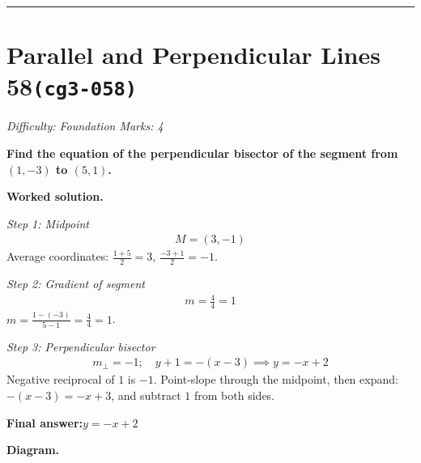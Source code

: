 \documentclass[11pt]{article}
\newcommand{\question}[1]{\par\medskip\noindent\textbf{#1}\par}
\begin{document}
\medskip\hrule

\section*{Parallel and Perpendicular Lines 58\quad\small\texttt{(cg3-058)}}
\textit{Difficulty: Foundation \quad\textbar\quad Marks: 4}

\question{Find the equation of the perpendicular bisector of the segment from \( (1, -3) \) to \( (5, 1) \).}

\textbf{Worked solution.}

\textit{Step 1: Midpoint}
\[\begin{gathered}
M = (3, -1)
\end{gathered}\]
Average coordinates: \( \tfrac{1+5}{2} = 3 \), \( \tfrac{-3+1}{2} = -1 \).

\textit{Step 2: Gradient of segment}
\[\begin{gathered}
m = \frac{4}{4} = 1
\end{gathered}\]
\( m = \tfrac{1 - (-3)}{5 - 1} = \tfrac{4}{4} = 1 \).

\textit{Step 3: Perpendicular bisector}
\[\begin{gathered}
m_{\perp} = -1; \quad y + 1 = -(x - 3) \implies y = -x + 2
\end{gathered}\]
Negative reciprocal of \( 1 \) is \( -1 \). Point-slope through the midpoint, then expand: \( -(x-3) = -x + 3 \), and subtract \( 1 \) from both sides.

\begin{answerbox}
\textbf{Final answer:}\quad \(\displaystyle y = -x + 2\)
\end{answerbox}
\textbf{Diagram.}
\end{document}
